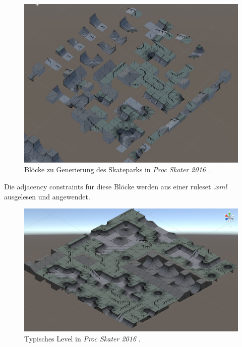 \documentclass[12pt, a4paper,twoside,openany]{report} %
\begin{document}
\begin{figure}[H]
    \centering
    \includegraphics[width=0.9\linewidth]{images/proc-skater-ruleset.png}%
    \caption{Blöcke zu Generierung des Skateparks in \textit{Proc Skater 2016} \cite{procskater2016}.}%
\end{figure}

Die adjacency constraints für diese Blöcke werden aus einer ruleset $.xml$ ausgelesen und angewendet.

\begin{figure}[H]
    \centering
    \includegraphics[width=0.9\linewidth]{images/proc-skate-level.png}%
    \caption{Typisches Level in \textit{Proc Skater 2016} \cite{procskater2016}.}%
\end{figure}
\end{document}
